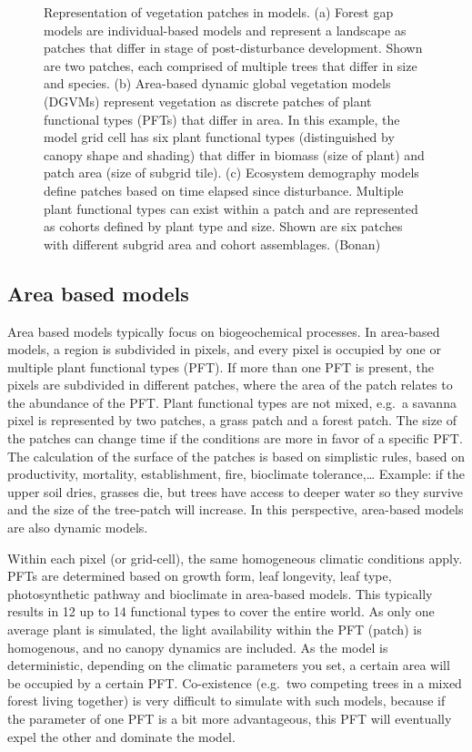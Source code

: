 \documentclass[12pt,oneside]{book}
\begin{document}
\begin{figure}
{}

\caption{Representation of vegetation patches in models. (a) Forest gap models are individual-based models and represent a landscape as patches that differ in stage of post-disturbance development. Shown are two patches, each comprised of multiple trees that differ in size and species. (b) Area-based dynamic global vegetation models (DGVMs) represent vegetation as discrete patches of plant functional types (PFTs) that differ in area. In this example, the model grid cell has six plant functional types (distinguished by canopy shape and shading) that differ in biomass (size of plant) and patch area (size of subgrid tile). (c) Ecosystem demography models define patches based on time elapsed since disturbance. Multiple plant functional types can exist within a patch and are represented as cohorts defined by plant type and size. Shown are six patches with different subgrid area and cohort assemblages. (Bonan)}\label{fig:f63}
\end{figure}

\subsection{Area based models}\label{area-based-models}

Area based models typically focus on biogeochemical processes. In
area-based models, a region is subdivided in pixels, and every pixel is
occupied by one or multiple plant functional types (PFT). If more than
one PFT is present, the pixels are subdivided in different patches,
where the area of the patch relates to the abundance of the PFT. Plant
functional types are not mixed, e.g.~a savanna pixel is represented by
two patches, a grass patch and a forest patch. The size of the patches
can change time if the conditions are more in favor of a specific PFT.
The calculation of the surface of the patches is based on simplistic
rules, based on productivity, mortality, establishment, fire, bioclimate
tolerance,\ldots{} Example: if the upper soil dries, grasses die, but
trees have access to deeper water so they survive and the size of the
tree-patch will increase. In this perspective, area-based models are
also dynamic models.

Within each pixel (or grid-cell), the same homogeneous climatic
conditions apply. PFTs are determined based on growth form, leaf
longevity, leaf type, photosynthetic pathway and bioclimate in
area-based models. This typically results in 12 up to 14 functional
types to cover the entire world. As only one average plant is simulated,
the light availability within the PFT (patch) is homogenous, and no
canopy dynamics are included. As the model is deterministic, depending
on the climatic parameters you set, a certain area will be occupied by a
certain PFT. Co-existence (e.g.~two competing trees in a mixed forest
living together) is very difficult to simulate with such models, because
if the parameter of one PFT is a bit more advantageous, this PFT will
eventually expel the other and dominate the model.
\end{document}
